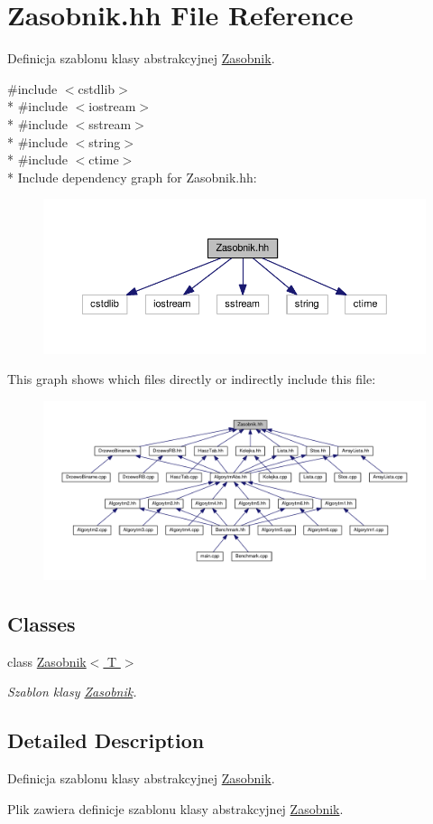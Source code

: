 \hypertarget{a00057}{}\section{Zasobnik.\+hh File Reference}
\label{a00057}


Definicja szablonu klasy abstrakcyjnej \hyperlink{a00019}{Zasobnik}.  


{\ttfamily \#include $<$cstdlib$>$}\\*
{\ttfamily \#include $<$iostream$>$}\\*
{\ttfamily \#include $<$sstream$>$}\\*
{\ttfamily \#include $<$string$>$}\\*
{\ttfamily \#include $<$ctime$>$}\\*
Include dependency graph for Zasobnik.\+hh\+:
\nopagebreak
\begin{figure}[H]
\begin{center}
\leavevmode
\includegraphics[width=350pt]{a00114}
\end{center}
\end{figure}
This graph shows which files directly or indirectly include this file\+:
\nopagebreak
\begin{figure}[H]
\begin{center}
\leavevmode
\includegraphics[width=350pt]{a00115}
\end{center}
\end{figure}
\subsection*{Classes}
\begin{DoxyCompactItemize}
\item 
class \hyperlink{a00019}{Zasobnik$<$ T $>$}
\begin{DoxyCompactList}\small\item\em Szablon klasy \hyperlink{a00019}{Zasobnik}. \end{DoxyCompactList}\end{DoxyCompactItemize}


\subsection{Detailed Description}
Definicja szablonu klasy abstrakcyjnej \hyperlink{a00019}{Zasobnik}. 

Plik zawiera definicje szablonu klasy abstrakcyjnej \hyperlink{a00019}{Zasobnik}. 